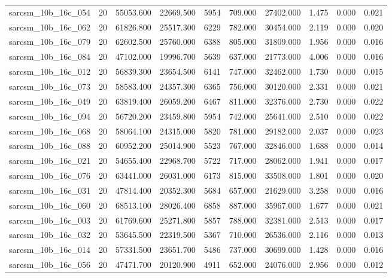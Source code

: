 \begin{tabular}{lrrrrrrrrr}
sarcsm\_10b\_16c\_054 & 20 & 55053.600 & 22669.500 & 5954 & 709.000 & 27402.000 & 1.475 & 0.000 & 0.021 \\
sarcsm\_10b\_16c\_062 & 20 & 61826.800 & 25517.300 & 6229 & 782.000 & 30454.000 & 2.119 & 0.000 & 0.020 \\
sarcsm\_10b\_16c\_079 & 20 & 62602.500 & 25760.000 & 6388 & 805.000 & 31809.000 & 1.956 & 0.000 & 0.016 \\
sarcsm\_10b\_16c\_084 & 20 & 47102.000 & 19996.700 & 5639 & 637.000 & 21773.000 & 4.006 & 0.000 & 0.016 \\
sarcsm\_10b\_16c\_012 & 20 & 56839.300 & 23654.500 & 6141 & 747.000 & 32462.000 & 1.730 & 0.000 & 0.015 \\
sarcsm\_10b\_16c\_073 & 20 & 58583.400 & 24357.300 & 6365 & 756.000 & 30120.000 & 2.331 & 0.000 & 0.021 \\
sarcsm\_10b\_16c\_049 & 20 & 63819.400 & 26059.200 & 6467 & 811.000 & 32376.000 & 2.730 & 0.000 & 0.022 \\
sarcsm\_10b\_16c\_094 & 20 & 56720.200 & 23459.800 & 5954 & 742.000 & 25641.000 & 2.510 & 0.000 & 0.022 \\
sarcsm\_10b\_16c\_068 & 20 & 58064.100 & 24315.000 & 5820 & 781.000 & 29182.000 & 2.037 & 0.000 & 0.023 \\
sarcsm\_10b\_16c\_088 & 20 & 60952.200 & 25014.900 & 5523 & 767.000 & 32846.000 & 1.688 & 0.000 & 0.014 \\
sarcsm\_10b\_16c\_021 & 20 & 54655.400 & 22968.700 & 5722 & 717.000 & 28062.000 & 1.941 & 0.000 & 0.017 \\
sarcsm\_10b\_16c\_076 & 20 & 63441.000 & 26031.000 & 6173 & 815.000 & 33508.000 & 1.801 & 0.000 & 0.020 \\
sarcsm\_10b\_16c\_031 & 20 & 47814.400 & 20352.300 & 5684 & 657.000 & 21629.000 & 3.258 & 0.000 & 0.016 \\
sarcsm\_10b\_16c\_060 & 20 & 68513.100 & 28026.400 & 6858 & 887.000 & 35967.000 & 1.677 & 0.000 & 0.021 \\
sarcsm\_10b\_16c\_003 & 20 & 61769.600 & 25271.800 & 5857 & 788.000 & 32381.000 & 2.513 & 0.000 & 0.017 \\
sarcsm\_10b\_16c\_032 & 20 & 53645.500 & 22319.500 & 5367 & 710.000 & 26536.000 & 2.116 & 0.000 & 0.013 \\
sarcsm\_10b\_16c\_014 & 20 & 57331.500 & 23651.700 & 5486 & 737.000 & 30699.000 & 1.428 & 0.000 & 0.016 \\
sarcsm\_10b\_16c\_056 & 20 & 47471.700 & 20120.900 & 4911 & 652.000 & 24076.000 & 2.956 & 0.000 & 0.012 \\

\end{tabular}
